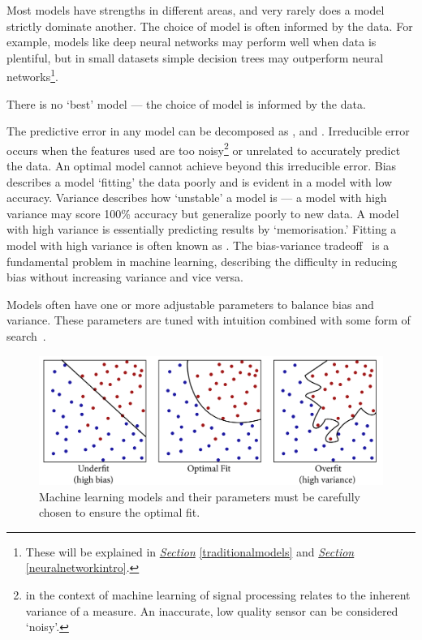 \documentclass[12pt, twoside]{book}
\renewcommand\emph[1]{\textit{\color{USred}{#1}}}
\begin{document}
Most models have strengths in different areas, and very rarely does a model strictly dominate another. The choice of model is often informed by the data. For example, models like deep neural networks may perform well when data is plentiful, but in small datasets simple decision trees may outperform neural networks\footnote{These will be explained in \textit{\hyperref[traditionalmodels]{Section}} \ref{traditionalmodels} and \textit{\hyperref[neuralnetworkintro]{Section}} \ref{neuralnetworkintro}.}.



\begin{highlight}
There is no `best' model --- the choice of model is informed by the data. 
\end{highlight}

The predictive error in any model can be decomposed as \emph{irreducible error}, \emph{bias} and \emph{variance}. Irreducible error occurs when the features used are too noisy\footnote{\emph{Noisy} in the context of machine learning of signal processing relates to the inherent variance of a measure. An inaccurate, low quality sensor can be considered `noisy'.} or unrelated to accurately predict the data. An optimal model cannot achieve beyond this irreducible error. Bias describes a model `fitting' the data poorly and is evident in a model with low accuracy. Variance describes how `unstable' a model is --- a model with high variance may score 100\% accuracy but generalize poorly to new data. A model with high variance is essentially predicting results by `memorisation.' Fitting a model with high variance is often known as \emph{overfitting}. The bias-variance tradeoff~\cite{biasvarnn} is a fundamental problem in machine learning, describing the difficulty in reducing bias without increasing variance and vice versa. 

Models often have one or more adjustable parameters to balance bias and variance. These parameters are tuned with intuition combined with some form of search~\cite{gridsearch, tpe}. 

\begin{figure}[h]
\centering\includegraphics[width=1\linewidth]{overfit2.png}
\caption{Machine learning models and their parameters must be carefully chosen to ensure the optimal fit.}
\label{overfitex}
\end{figure}
\end{document}
